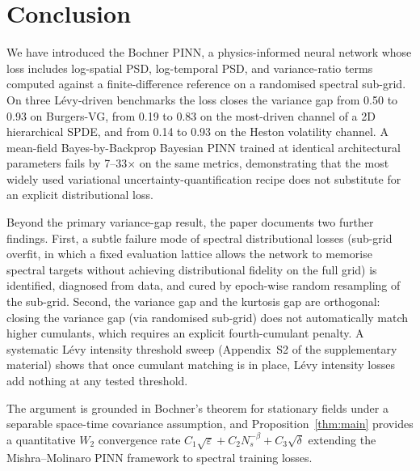 \documentclass[review,12pt]{elsarticle}
\begin{document}
\section{Conclusion}
\label{sec:conclusion}

We have introduced the Bochner PINN, a physics-informed neural
network whose loss includes log-spatial PSD, log-temporal PSD,
and variance-ratio terms computed against a finite-difference
reference on a randomised spectral sub-grid. On three L\'evy-driven
benchmarks the loss closes the variance gap from 0.50 to 0.93 on
Burgers-VG, from 0.19 to 0.83 on the most-driven channel of a
2D hierarchical SPDE, and from 0.14 to 0.93 on the Heston
volatility channel. A mean-field Bayes-by-Backprop Bayesian PINN
trained at identical architectural parameters fails by
7--33\(\times\) on the same metrics, demonstrating that the most
widely used variational uncertainty-quantification recipe does
not substitute for an explicit distributional loss.

Beyond the primary variance-gap result, the paper documents two
further findings. First, a subtle failure mode of spectral
distributional losses (sub-grid overfit, in which a fixed
evaluation lattice allows the network to memorise spectral targets
without achieving distributional fidelity on the full grid)
is identified, diagnosed from data, and cured by epoch-wise random
resampling of the sub-grid. Second, the variance gap and the
kurtosis gap are orthogonal: closing the variance gap (via
randomised sub-grid) does not automatically match higher cumulants,
which requires an explicit fourth-cumulant penalty. A systematic
L\'evy intensity threshold sweep (Appendix~S2 of the supplementary material)
shows that once cumulant matching is in place, L\'evy intensity
losses add nothing at any tested threshold.

The argument is grounded in Bochner's theorem for stationary
fields under a separable space-time covariance assumption, and
Proposition~\ref{thm:main} provides a quantitative
\(W_2\) convergence rate
\(C_1\sqrt\varepsilon + C_2 N_s^{-\beta} + C_3\sqrt\delta\)
extending the Mishra--Molinaro PINN framework to spectral training
losses.
\end{document}
